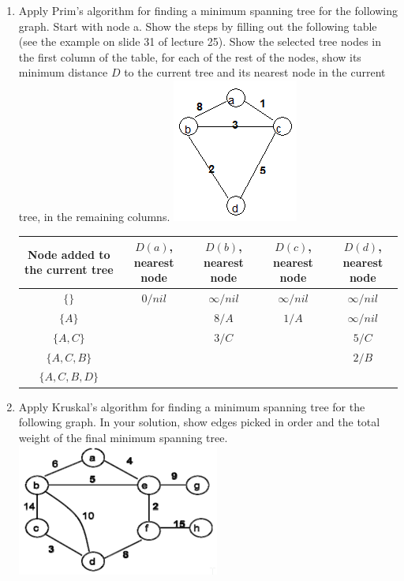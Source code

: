 \documentclass{article}
\begin{document}
\begin{enumerate}
    \item Apply Prim's algorithm for finding a minimum spanning tree for the 
    following graph. Start with node a. Show the steps by filling out the 
    following table (see the example on slide 31 of lecture 25). Show the 
    selected tree nodes in the first column of the table, for each of the rest 
    of the nodes, show its minimum distance $D$ to the current tree and its 
    nearest node in the current tree, in the remaining columns.\newline
    \includegraphics[scale=0.75]{p4_graph}\newline
    \begin{tabular}{|c |c |c |c |c|}
        \hline
        Node added to the current tree & $D(a)$, nearest node & $D(b)$, 
        nearest node & $D(c)$, nearest node & $D(d)$, nearest node\\
        \hline
        $\{\}$ & $0/nil$ & $\infty/nil$ & $\infty/nil$ & $\infty/nil$\\
        \hline
        $\{A\}$ & & $8/A$ & $1/A$ & $\infty/nil$\\
        \hline
        $\{A,C\}$ & & $3/C$ & & $5/C$\\
        \hline
        $\{A,C,B\}$ & & & & $2/B$ \\
        \hline
        $\{A,C,B,D\}$ & & & & \\
        \hline
    \end{tabular}
    
    \item Apply Kruskal’s algorithm for finding a minimum spanning tree for 
    the following graph. In your solution, show edges picked in order and the 
    total weight of the final minimum spanning tree.\newline
    \includegraphics[scale=0.75]{p5_graph}\newline


\end{enumerate}
\end{document}
